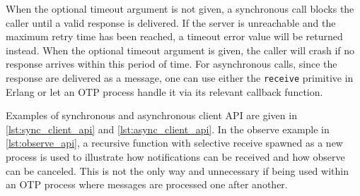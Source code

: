 When the optional timeout argument is not given, a synchronous call blocks the caller until a valid response is delivered. If the server is unreachable and the maximum retry time has been reached, a timeout error value will be returned instead. When the optional timeout argument is given, the caller will crash if no response arrives within this period of time. For asynchronous calls, since the response are delivered as a message, one can use either the \verb|receive| primitive in Erlang or let an OTP process handle it via its relevant callback function. 

Examples of synchronous and asynchronous client API are given in \autoref{lst:sync_client_api} and \autoref{lst:async_client_api}. In the observe example in \autoref{lst:observe_api}, a recursive function with selective receive spawned as a new process is used to illustrate how notifications can be received and how observe can be canceled. This is not the only way and unnecessary if being used within an OTP process where messages are processed one after another.


